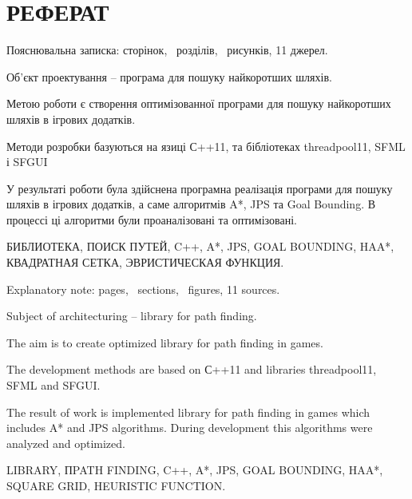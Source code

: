 \section*{РЕФЕРАТ}

\vspace{1\baselineskip}

\thispagestyle{empty}

Пояснювальна записка: \pageref{LastPage} сторінок, \totalsections\ розділів,  \totalfigures\ рисунків, 11 джерел.

Об'єкт проектування -- програма для пошуку найкоротших шляхів.

Метою роботи є створення оптимізованної програми для пошуку найкоротших шляхів в ігрових додатків.

Методи розробки базуються на язиці С++11, та бібліотеках threadpool11, SFML і SFGUI

У результаті роботи була здійснена програмна реалізація програми для пошуку шляхів в ігрових додатків, а саме алгоритмів A*, JPS та Goal Bounding. В процессі ці алгоритми були проаналізовані та оптимізовані.

БИБЛИОТЕКА, ПОИСК ПУТЕЙ, C++, A*, JPS, GOAL BOUNDING, HAA*, КВАДРАТНАЯ СЕТКА, ЭВРИСТИЧЕСКАЯ ФУНКЦИЯ.

\vspace{1\baselineskip}

Explanatory note: \pageref{LastPage} pages, \totalsections\ sections,  \totalfigures\ figures, 11 sources.

Subject of architecturing -- library for path finding.

The aim is to create optimized library for path finding in games.

The development methods are based on С++11 and libraries threadpool11, SFML and SFGUI.

The result of work is implemented library for path finding in games which includes A* and JPS algorithms. During development this algorithms were analyzed and optimized.

LIBRARY, ПPATH FINDING, C++, A*, JPS, GOAL BOUNDING, HAA*, SQUARE GRID, HEURISTIC FUNCTION.